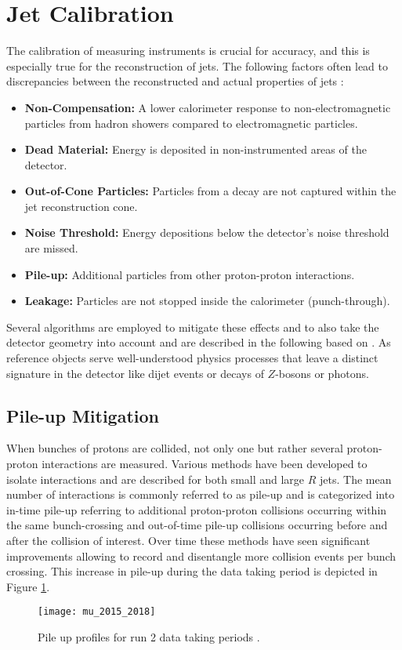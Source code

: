 \section{Jet Calibration}\label{sec:calibration}
The calibration of measuring instruments is crucial for accuracy, and this is especially true for the reconstruction of jets. The following factors often lead to discrepancies between the reconstructed and actual properties of jets \citep{atlas2011jet}:
\begin{itemize}
\item \textbf{Non-Compensation:} A lower calorimeter response to non-electromagnetic particles from hadron showers compared to electromagnetic particles.
\item \textbf{Dead Material:} Energy is deposited in non-instrumented areas of the detector.
\item \textbf{Out-of-Cone Particles:} Particles from a decay are not captured within the jet reconstruction cone.
\item \textbf{Noise Threshold:} Energy depositions below the detector's noise threshold are missed.
\item \textbf{Pile-up:} Additional particles from other proton-proton interactions. 
\item \textbf{Leakage:} Particles are not stopped inside the calorimeter (punch-through).
\end{itemize}
Several algorithms are employed to mitigate these effects and to also take the detector geometry into account and are described in the following based on \citep{atlas2021jet}. As reference objects serve well-understood physics processes that leave a distinct signature in the detector like dijet events or decays of $Z$-bosons or photons.

\subsection{Pile-up Mitigation}
When bunches of protons are collided, not only one but rather several proton-proton interactions are measured. Various methods have been developed to isolate interactions and are described for both small and large $R$ jets. The mean number of interactions is commonly referred to as pile-up and is categorized into in-time pile-up referring to additional proton-proton collisions occurring within the same bunch-crossing and out-of-time pile-up collisions occurring before and after the collision of interest. Over time these methods have seen significant improvements allowing to record and disentangle more collision events per bunch crossing. This increase in pile-up during the data taking period is depicted in Figure \ref{fig:pileup}.
\begin{figure}
  \centering
  \texttt{[image: mu\_2015\_2018]}
  \caption[]{Pile up profiles for run 2 data taking periods \citep{pileup}.}
  \label{fig:pileup}
\end{figure}


